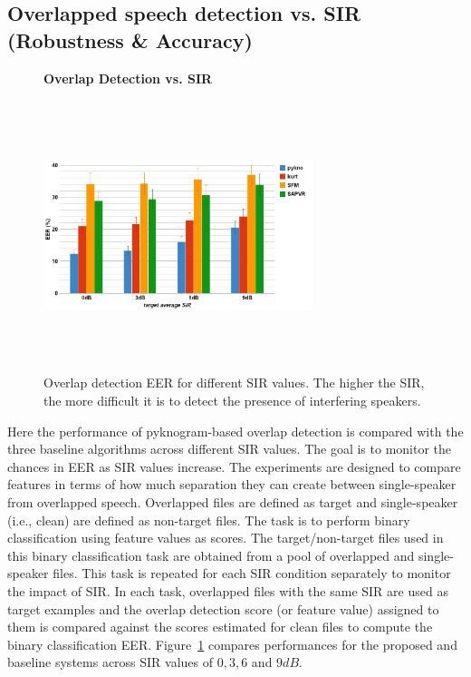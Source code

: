 {\subsection{Overlapped speech detection vs. SIR (Robustness \& Accuracy)}
\label{sssec:ovl_frame_vs_sir}
\begin{figure}[b!]
	\centering
	\hspace{-1mm}
	\textbf{Overlap Detection vs. SIR}\par\medskip
	\includegraphics[height = 3.1in, width=0.7\textwidth]{figures/ovldet_vs_sir}
	\vspace{-1mm}
	\caption{Overlap detection EER for different SIR values. The higher the SIR, the more difficult it is to detect the presence of interfering speakers.}
	\vspace{0mm}
	\label{fig:ovl_det}
\end{figure}
Here the performance of pyknogram-based overlap detection is compared with the three baseline algorithms across different SIR values. 
The goal is to monitor the chances in EER as SIR values increase. 
The experiments are designed to compare features in terms of how much separation they can create between single-speaker from overlapped speech. 
Overlapped files are defined as target and single-speaker (i.e., clean) are defined as non-target files. 
The task is to perform binary classification using feature values as scores. 
The target/non-target files used in this binary classification task are obtained from a pool of overlapped and single-speaker files. 
This task is repeated for each SIR condition separately to monitor the impact of SIR. 
In each task, overlapped files with the same SIR are used as target examples and the overlap detection score (or feature value) assigned to them is compared against the scores estimated for clean files to compute the binary classification EER. 
Figure~\ref{fig:ovl_det} compares performances for the proposed and baseline systems across SIR values of $0, 3, 6$ and $9dB$.


}
